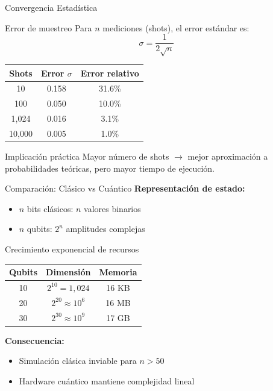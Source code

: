 \documentclass[aspectratio=169]{beamer}
\begin{document}
\begin{frame}{Convergencia Estadística}
\begin{block}{Error de muestreo}
Para $n$ mediciones (shots), el error estándar es:
\[
\sigma = \frac{1}{2\sqrt{n}}
\]
\end{block}

\vspace{0.1cm}
\begin{center}
\begin{tabular}{|c|c|c|}
\hline
\textbf{Shots} & \textbf{Error $\sigma$} & \textbf{Error relativo} \\
\hline
10 & 0.158 & 31.6\% \\
100 & 0.050 & 10.0\% \\
1,024 & 0.016 & 3.1\% \\
10,000 & 0.005 & 1.0\% \\
\hline
\end{tabular}
\end{center}

\begin{exampleblock}{Implicación práctica}
Mayor número de shots $\rightarrow$ mejor aproximación a probabilidades teóricas, pero mayor tiempo de ejecución.
\end{exampleblock}
\end{frame}

\begin{frame}{Comparación: Clásico vs Cuántico}
\textbf{Representación de estado:}
\begin{itemize}
\item $n$ bits clásicos: $n$ valores binarios
\item $n$ qubits: $2^n$ amplitudes complejas
\end{itemize}

\vspace{0.3cm}
\begin{block}{Crecimiento exponencial de recursos}
\begin{center}
\begin{tabular}{|c|c|c|}
\hline
\textbf{Qubits} & \textbf{Dimensión} & \textbf{Memoria} \\
\hline
10 & $2^{10} = 1,024$ & 16 KB \\
20 & $2^{20} \approx 10^6$ & 16 MB \\
30 & $2^{30} \approx 10^9$ & 17 GB \\
\hline
\end{tabular}
\end{center}
\end{block}

\vspace{0.3cm}
\textbf{Consecuencia:}
\begin{itemize}
\item Simulación clásica inviable para $n > 50$
\item Hardware cuántico mantiene complejidad lineal
\end{itemize}
\end{frame}
\end{document}
